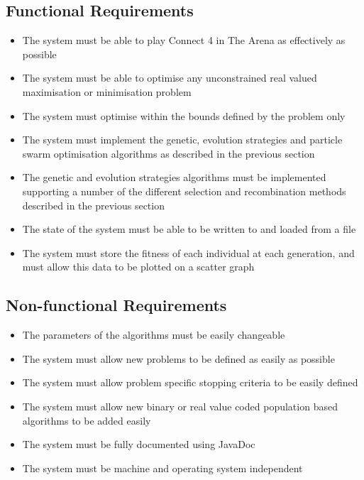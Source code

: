\subsection{Functional Requirements}
\begin{itemize}
  \item{The system must be able to play Connect 4 in The Arena as effectively as possible} 
  \item{The system must be able to optimise any unconstrained real valued maximisation or minimisation problem}
  \item{The system must optimise within the bounds defined by the problem only}
  \item{The system must implement the genetic, evolution strategies and particle swarm optimisation algorithms as described in the previous section}
  \item{The genetic and evolution strategies algorithms must be implemented supporting a number of the different selection and recombination methods described in the previous section}
  \item{The state of the system must be able to be written to and loaded from a file}
  \item{The system must store the fitness of each individual at each generation, and must allow this data to be plotted on a scatter graph}
\end{itemize}

\subsection{Non-functional Requirements}
\begin{itemize}
  \item{The parameters of the algorithms must be easily changeable} 
  \item{The system must allow new problems to be defined as easily as possible} 
  \item{The system must allow problem specific stopping criteria to be easily defined}
  \item{The system must allow new binary or real value coded population based algorithms to be added easily}
  \item{The system must be fully documented using JavaDoc}
  \item{The system must be machine and operating system independent}
\end{itemize}

